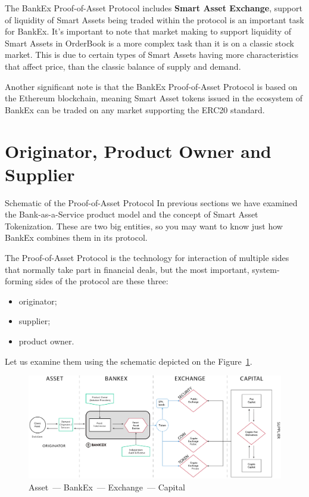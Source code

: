 \documentclass{article}
\begin{document}
\begin{multicols}{2}
The BankEx Proof-of-Asset Protocol includes \textbf{Smart Asset Exchange}, support of liquidity of Smart Assets being traded within the protocol is an important task for BankEx. It’s important to note that market making to support liquidity of Smart Assets in OrderBook is a more complex task than it is on a classic stock market. This is due to certain types of Smart Assets having more characteristics that affect price, than the classic balance of supply and demand. 

Another significant note is that the BankEx Proof-of-Asset Protocol is based on the Ethereum blockchain, meaning Smart Asset tokens issued in the ecosystem of BankEx can be traded on any market supporting the ERC20 standard.

\section{Originator, Product Owner and Supplier}

Schematic of the Proof-of-Asset Protocol
In previous sections we have examined the Bank-as-a-Service product model and the concept of Smart Asset Tokenization. These are two big entities, so you may want to know just how BankEx combines them in its protocol.

The Proof-of-Asset Protocol is the technology for interaction of multiple sides that normally take part in financial deals, but the most important, system-forming sides of the protocol are these three:
	
\begin{itemize}
\item originator;
\item supplier;
\item product owner.
\end{itemize}

Let us examine them using the schematic depicted on the Figure~\ref{fig:asset-bankex-exchange-capital}.

\begin{figure}
  \centering
  \includegraphics[width=\textwidth]{asset-bankex-exchange-capital.png}
  \caption{Asset~--- BankEx~--- Exchange~--- Capital}
  \label{fig:asset-bankex-exchange-capital}
\end{figure}


\end{multicols}
\end{document}
